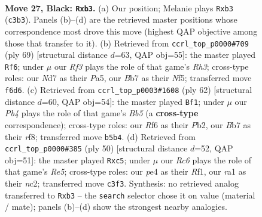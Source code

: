 \documentclass[11pt]{article}
\begin{document}
\clearpage

\begin{figure}[p]\centering
\begin{subfigure}{0.46\textwidth}\centering
\resizebox{\linewidth}{!}{%
\newchessgame
\chessboard[
  setfen={7k/1b1n1p1p/5rp1/pp1Pp3/4P3/1Pr2PP1/7P/R3K1NR b - - 0 27},
  showmover=false,
  pgfstyle=straightmove, color=movearrow, markmove={c3-b3}
]}
\caption{}
\end{subfigure}\hfill
\begin{subfigure}{0.46\textwidth}\centering
\resizebox{\linewidth}{!}{%
\newchessgame
\chessboard[
  setfen={5k2/5p1p/1p1p3r/pPr2np1/2P1R3/5PP1/P2R3P/5BK1 b - - 3 35},
  showmover=false,
  pgfstyle=straightmove, color=movearrow, markmove={h6-f6}
]}
\caption{}
\end{subfigure}
\\[4pt]
\begin{subfigure}{0.46\textwidth}\centering
\resizebox{\linewidth}{!}{%
\newchessgame
\chessboard[
  setfen={2n2r2/2r3kp/3pR1p1/pB1p2P1/Pp1R1P2/8/1PP5/1K6 w - - 6 32},
  showmover=false,
  pgfstyle=straightmove, color=movearrow, markmove={b5-f1}
]}
\caption{}
\end{subfigure}\hfill
\begin{subfigure}{0.46\textwidth}\centering
\resizebox{\linewidth}{!}{%
\newchessgame
\chessboard[
  setfen={r5k1/5pp1/p3p2p/2p1R3/N1P5/P5P1/1Pnr1P1P/5RK1 w - - 3 26},
  showmover=false,
  pgfstyle=straightmove, color=movearrow, markmove={e5-c5}
]}
\caption{}
\end{subfigure}
\caption{\textbf{Move 27, Black: \texttt{Rxb3}.} (a) Our position; Melanie plays \texttt{Rxb3} (\texttt{c3b3}). Panels (b)--(d) are the retrieved master positions whose correspondence most drove this move (highest QAP objective among those that transfer to it). (b) Retrieved from \texttt{ccrl\_top\_p0000\#709} (ply 69) [structural distance $d$=63, QAP obj=55]: the master played \texttt{Rf6}; under $\mu$ our \emph{Rf3} plays the role of that game's \emph{Rh3}; cross-type roles: our \emph{N}d7 as their \emph{P}a5, our \emph{B}b7 as their \emph{N}f5; transferred move \texttt{f6d6}. (c) Retrieved from \texttt{ccrl\_top\_p0003\#1608} (ply 62) [structural distance $d$=60, QAP obj=54]: the master played \texttt{Bf1}; under $\mu$ our \emph{Pb4} plays the role of that game's \emph{Bb5} (a \textbf{cross-type} correspondence); cross-type roles: our \emph{R}f6 as their \emph{P}b2, our \emph{B}b7 as their \emph{r}f8; transferred move \texttt{b5b4}. (d) Retrieved from \texttt{ccrl\_top\_p0000\#385} (ply 50) [structural distance $d$=52, QAP obj=51]: the master played \texttt{Rxc5}; under $\mu$ our \emph{Rc6} plays the role of that game's \emph{Re5}; cross-type roles: our \emph{p}e4 as their \emph{R}f1, our \emph{r}a1 as their \emph{n}c2; transferred move \texttt{c3f3}. Synthesis: no retrieved analog transferred to \texttt{Rxb3} -- the \texttt{search} selector chose it on value (material / mate); panels (b)--(d) show the strongest nearby analogies.}
\label{fig:thought-m53}
\end{figure}
\end{document}
